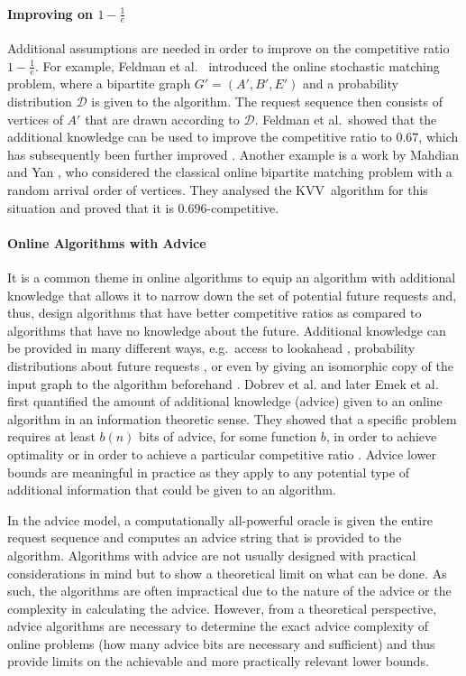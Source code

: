 \documentclass[a4paper]{article}
\begin{document}
\paragraph*{Improving on $1-\frac{1}{e}$} Additional assumptions are needed in order to improve on the
competitive ratio $1-\frac{1}{e}$. For example, Feldman et al.~\cite{fmmm09} introduced the online stochastic matching
problem, where a bipartite graph $G' = (A', B', E')$ and a probability distribution $\mathcal{D}$ is
given to the algorithm. The request sequence then consists of vertices of $A'$ that are
drawn according to $\mathcal{D}$. Feldman et al.\ showed that the additional knowledge can be used to
improve the competitive ratio to $0.67$, which has subsequently
been further improved \cite{bk10,mgs11}. Another example is a work by Mahdian and Yan \cite{my11}, who considered
the classical online bipartite matching problem with a random arrival order of vertices. They analysed the
\textsc{KVV}~algorithm for this situation and proved that it is $0.696$-competitive.

\paragraph*{Online Algorithms with Advice}
It is a common theme in online algorithms to equip an algorithm with additional knowledge that
allows it to narrow down the set of potential future requests and, thus, design algorithms that have
better competitive ratios as compared to algorithms that have no knowledge about the future. Additional
knowledge can be provided in many different ways, e.g.\ access to lookahead \cite{hs92,g95}, probability
distributions about future requests \cite{fmmm09,my11},
or even by giving an isomorphic copy of the
input graph to the algorithm beforehand \cite{h99}. Dobrev et al. \cite{DRP2008} and later Emek et al. \cite{efkr11} first quantified
the amount of additional knowledge (advice) given to an online algorithm in an information theoretic sense.
They showed that a specific problem requires at least $b(n)$ bits of advice, for some function $b$, in order
to achieve optimality  \cite{DRP2008} or in order to achieve a particular competitive ratio \cite{efkr11}.
Advice lower bounds are meaningful in practice as they apply to any potential type of
additional information that could be given to an algorithm.

In the advice model, a computationally all-powerful oracle is given the entire request sequence and
computes an advice string that is provided to the algorithm.
Algorithms with advice are not usually designed with practical considerations in mind but to show a
theoretical limit on what can be done. As such, the algorithms are often impractical due to the nature of
the advice or the complexity in calculating the advice.
However, from a theoretical perspective, advice algorithms are necessary to determine the exact advice
complexity of online problems (how many advice bits are necessary and sufficient) and thus provide limits on
the achievable and more practically relevant lower bounds.
\end{document}
